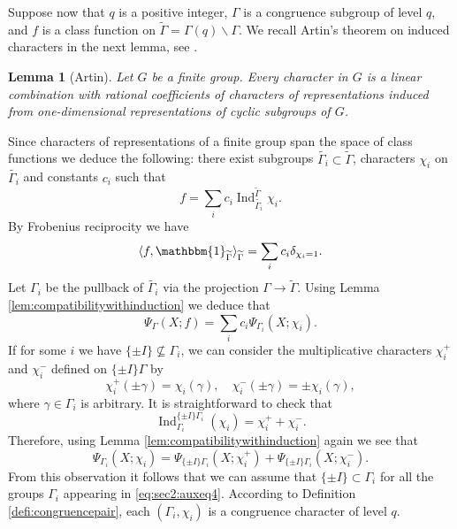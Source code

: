 \documentclass{article}
\newtheorem{lem}[thm]{Lemma}
\theoremstyle{named}
\DeclareMathOperator{\Ind}{Ind}
\begin{document}
Suppose now that $q$ is a positive integer, $\Gamma$ is a congruence subgroup of level $q$, and $f$ is a class function on $\widetilde{\Gamma} = \Gamma(q)\backslash \Gamma$. We recall Artin's theorem on induced characters in the next lemma, see \cite[Section 9.2]{serrelinearreps}.
\begin{lem}[Artin]\label{lem:Artinstheorem}
Let $G$ be a finite group. Every character in $G$ is a linear combination with rational coefficients of characters of representations induced from one-dimensional representations of cyclic subgroups of $G$.
\end{lem}
Since characters of representations of a finite group span the space of class functions we deduce the following: there exist subgroups $\widetilde{\Gamma_i} \subset \widetilde{\Gamma}$, characters $\chi_i$ on $\widetilde{\Gamma_i}$ and constants $c_i$ such that 
\begin{equation}
    f = \sum_{i} c_i \Ind_{\widetilde{\Gamma_i}}^{\widetilde{\Gamma}} \chi_i.
\end{equation}
By Frobenius reciprocity we have 
\begin{equation*}
    \langle f, \mathbbm{1}_{\widetilde{\Gamma}}\rangle_{\widetilde{\Gamma}} = \sum_{i}  c_i \delta_{\chi_i  = 1}.
\end{equation*}
Let $\Gamma_i$ be the pullback of $\widetilde{\Gamma_i}$ via the projection $\Gamma \rightarrow \widetilde{\Gamma}$. Using Lemma \ref{lem:compatibilitywithinduction} we deduce that
\begin{equation}\label{eq:sec2:auxeq4}
    \Psi_{\Gamma}(X; f) = \sum_{i} c_i \Psi_{\Gamma_i}(X; \chi_i).
\end{equation}
If for some $i$ we have $\{\pm I\}\nsubseteq \Gamma_i$, we can consider the multiplicative characters $\chi_i^+$ and $\chi_i^-$ defined on $\{\pm I\}\Gamma$ by
\begin{equation*}
    \chi_i^+(\pm \gamma) = \chi_i(\gamma), \quad \chi_i^-(\pm \gamma) = \pm \chi_i(\gamma),
\end{equation*}
where $\gamma \in \Gamma_i$ is arbitrary. It is straightforward to check that
\begin{equation*}
    \Ind_{\Gamma_i}^{\{\pm I\}\Gamma_i}(\chi_i) = \chi_i^+ + \chi_i^-.
\end{equation*}
Therefore, using Lemma \ref{lem:compatibilitywithinduction} again we see that
\begin{equation*}
    \Psi_{\Gamma_i}(X; \chi_i) = \Psi_{\{\pm I\}\Gamma_i}(X; \chi^+_i) + \Psi_{\{\pm I\}\Gamma_i}(X; \chi^-_i).
\end{equation*}
From this observation it follows that we can assume that $\{\pm I\} \subset \Gamma_i$ for all the groups $\Gamma_i$ appearing in \eqref{eq:sec2:auxeq4}. According to Definition \ref{defi:congruencepair}, each $(\Gamma_i, \chi_i)$ is a congruence character of level $q$.
\end{document}
